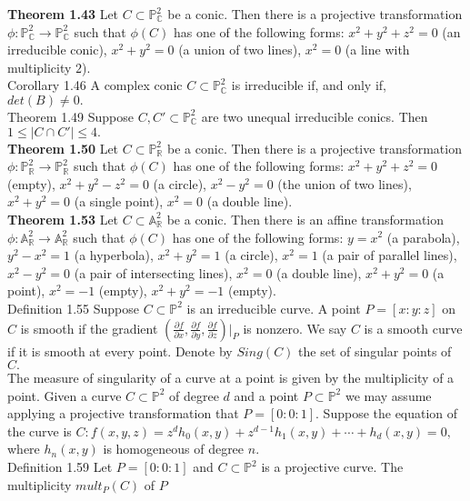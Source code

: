 \documentclass[8pt]{extarticle}
\begin{document}
\textbf{Theorem 1.43} Let $C\subset \mathbb{P}^2_\mathbb{C}$ be a conic. Then there is a projective transformation $\phi: \mathbb{P}^2_\mathbb{C} \rightarrow \mathbb{P}^2_\mathbb{C}$ such that $\phi(C)$ has one of the following forms: $x^2 + y^2 + z^2 = 0$ (an irreducible conic), $x^2 + y^2 = 0$ (a union of two lines), $x^2 = 0$ (a line with multiplicity $2$).\\
Corollary 1.46 A complex conic $C \subset \mathbb{P}^2_\mathbb{C}$ is irreducible if, and only if, $det(B) \neq 0.$\\
Theorem 1.49 Suppose $C, C' \subset \mathbb{P}^2_\mathbb{C}$ are two unequal irreducible conics. Then $1 \leq |C \cap C'| \leq 4.$\\
\textbf{Theorem 1.50} Let $C \subset \mathbb{P}^2_\mathbb{R}$ be a conic. Then there is a projective transformation $\phi: \mathbb{P}^2_\mathbb{R} \rightarrow \mathbb{P}^2_\mathbb{R}$ such that $\phi(C)$ has one of the following forms: $x^2 + y^2 + z^2 = 0$ (empty), $x^2 + y^2 - z^2 = 0$ (a circle), $x^2 - y^2 = 0$ (the union of two lines), $x^2 + y^2 = 0$ (a single point), $x^2 = 0$ (a double line).\\
\textbf{Theorem 1.53} Let $C \subset \mathbb{A}^2_\mathbb{R}$ be a conic. Then there is an affine transformation $\phi: \mathbb{A}^2_\mathbb{R} \rightarrow \mathbb{A}^2_\mathbb{R}$ such that $\phi(C)$ has one of the following forms: $y = x^2$ (a parabola), $y^2 - x^2 = 1$ (a hyperbola), $x^2 + y^2 = 1$ (a circle), $x^2 = 1$ (a pair of parallel lines), $x^2 - y^2 = 0$ (a pair of intersecting lines), $x^2 = 0$ (a double line), $x^2 + y^2 = 0$ (a point), $x^2 = -1$ (empty), $x^2 + y^2 = -1$ (empty).\\
Definition 1.55 Suppose $C \subset \mathbb{P}^2$ is an irreducible curve. A point $P = [x : y : z]$ on $C$ is smooth if the gradient $(\frac{\partial f}{\partial x},\frac{\partial f}{\partial y},\frac{\partial f}{\partial z})|_P$ is nonzero. We say $C$ is a smooth curve if it is smooth at every point. Denote by $Sing(C)$ the set of singular points of $C.$\\
The measure of singularity of a curve at a point is given by the multiplicity of a point. Given a curve $C \subset \mathbb{P}^2$ of degree $d$ and a point $P \subset \mathbb{P}^2$ we may assume applying a projective transformation that $P = [0 : 0 : 1].$ Suppose the equation of the curve is $C :f(x,y,z)=z^dh_0(x,y)+z^{d-1}h_1(x,y)+\cdots+h_d(x,y)=0,$ where $h_n(x,y)$ is homogeneous of degree $n.$\\
Definition 1.59 Let $P = [0 : 0 : 1]$ and $C \subset \mathbb{P}^2$ is a projective curve. The multiplicity $mult_P (C)$ of $P$
\end{document}
